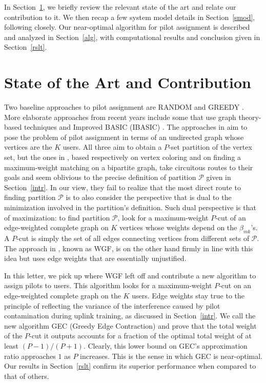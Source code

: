 \documentclass[]{IEEEtran}
\begin{document}
In Section~\ref{contr}, we briefly review the relevant state of the art and
relate our contribution to it. We then recap a few system model details in
Section~\ref{smod}, following \cite{naylm17} closely. Our near-optimal algorithm
for pilot assignment is described and analyzed in Section~\ref{alg}, with
computational results and conclusion given in Section~\ref{rslt}.

\section{State of the Art and Contribution}
\label{contr}

Two baseline approaches to pilot assignment are RANDOM and GREEDY
\cite{naylm17}. More elaborate approaches from recent years include some that
use graph theory-based techniques \cite{lzja20,bdfzf21,zhlw21} and Improved
BASIC (IBASIC) \cite{qzj22}. The approaches in \cite{lzja20,bdfzf21,zhlw21} aim
to pose the problem of pilot assignment in terms of an undirected graph whose
vertices are the $K$ users. All three aim to obtain a $P$-set partition of the
vertex set, but the ones in \cite{lzja20,bdfzf21}, based respectively on vertex
coloring and on finding a maximum-weight matching on a bipartite graph, take
circuitous routes to their goals and seem oblivious to the precise definition of
partition $\mathcal{P}$ given in Section~\ref{intr}. In our view, they fail to
realize that the most direct route to finding partition $\mathcal{P}$ is to also
consider the perspective that is dual to the minimization involved in the
partition's definition. Such dual perspective is that of maximization: to find
partition $\mathcal{P}$, look for a maximum-weight $P$-cut of an edge-weighted
complete graph on $K$ vertices whose weights depend on the $\beta_{mk}$'s. A
$P$-cut is simply the set of all edges connecting vertices from different sets
of $\mathcal{P}$. The approach in \cite{zhlw21}, known as WGF, is on the other
hand firmly in line with this idea but uses edge weights that are essentially
unjustified.

In this letter, we pick up where WGF left off and contribute a new algorithm to
assign pilots to users. This algorithm looks for a maximum-weight $P$-cut on an
edge-weighted complete graph on the $K$ users. Edge weights stay true to the
principle of reflecting the variance of the interference caused by pilot
contamination during uplink training, as discussed in Section~\ref{intr}. We
call the new algorithm GEC (Greedy Edge Contraction) and prove that the total
weight of the $P$-cut it outputs accounts for a fraction of the optimal total
weight of at least $(P-1)/(P+1)$. Clearly, this lower bound on GEC's
approximation ratio approaches $1$ as $P$ increases. This is the sense in which
GEC is near-optimal. Our results in Section~\ref{rslt} confirm its superior
performance when compared to that of others.
\end{document}
